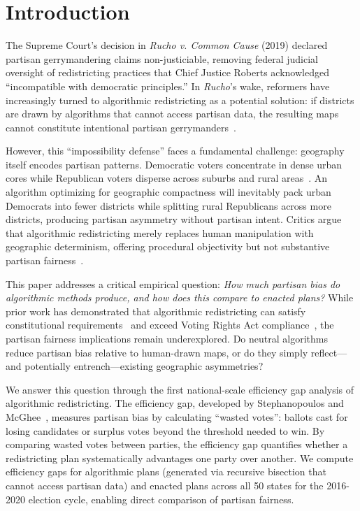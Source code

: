 \section{Introduction}

The Supreme Court's decision in \emph{Rucho v. Common Cause} (2019) declared partisan gerrymandering claims non-justiciable, removing federal judicial oversight of redistricting practices that Chief Justice Roberts acknowledged ``incompatible with democratic principles.'' In \emph{Rucho}'s wake, reformers have increasingly turned to algorithmic redistricting as a potential solution: if districts are drawn by algorithms that cannot access partisan data, the resulting maps cannot constitute intentional partisan gerrymanders~\cite{cho2016measuring,duchin2018geometry}.

However, this ``impossibility defense'' faces a fundamental challenge: geography itself encodes partisan patterns. Democratic voters concentrate in dense urban cores while Republican voters disperse across suburbs and rural areas~\cite{rodden2019cities,chen2013unintentional}. An algorithm optimizing for geographic compactness will inevitably pack urban Democrats into fewer districts while splitting rural Republicans across more districts, producing partisan asymmetry without partisan intent. Critics argue that algorithmic redistricting merely replaces human manipulation with geographic determinism, offering procedural objectivity but not substantive partisan fairness~\cite{stephanopoulos2015partisan}.

This paper addresses a critical empirical question: \emph{How much partisan bias do algorithmic methods produce, and how does this compare to enacted plans?} While prior work has demonstrated that algorithmic redistricting can satisfy constitutional requirements~\cite{deluca2026recursive} and exceed Voting Rights Act compliance~\cite{deluca2026vra}, the partisan fairness implications remain underexplored. Do neutral algorithms reduce partisan bias relative to human-drawn maps, or do they simply reflect—and potentially entrench—existing geographic asymmetries?

We answer this question through the first national-scale efficiency gap analysis of algorithmic redistricting. The efficiency gap, developed by Stephanopoulos and McGhee~\cite{stephanopoulos2015partisan}, measures partisan bias by calculating ``wasted votes'': ballots cast for losing candidates or surplus votes beyond the threshold needed to win. By comparing wasted votes between parties, the efficiency gap quantifies whether a redistricting plan systematically advantages one party over another. We compute efficiency gaps for algorithmic plans (generated via recursive bisection that cannot access partisan data) and enacted plans across all 50 states for the 2016-2020 election cycle, enabling direct comparison of partisan fairness.

